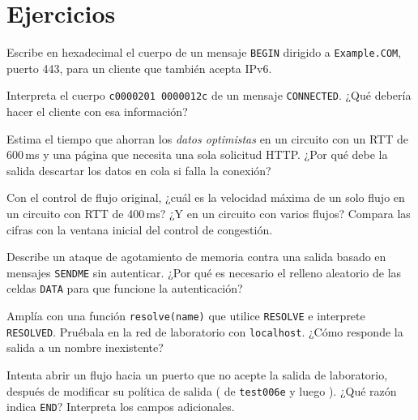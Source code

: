 \section*{Ejercicios}

\begin{esercizio}[1]\label{es:11-begin}
Escribe en hexadecimal el cuerpo de un mensaje \texttt{BEGIN} dirigido a \texttt{Example.COM}, puerto 443, para un cliente que también acepta IPv6.
\end{esercizio}

\begin{esercizio}[1]\label{es:11-connected}
Interpreta el cuerpo \texttt{c0000201 0000012c} de un mensaje \texttt{CONNECTED}. ¿Qué debería hacer el cliente con esa información?
\end{esercizio}

\begin{esercizio}[1]\label{es:11-optimistic}
Estima el tiempo que ahorran los \emph{datos optimistas} en un circuito con un RTT de 600\,ms y una página que necesita una sola solicitud HTTP. ¿Por qué debe la salida descartar los datos en cola si falla la conexión?
\end{esercizio}

\begin{esercizio}[2]\label{es:11-velocita}
Con el control de flujo original, ¿cuál es la velocidad máxima de un solo flujo en un circuito con RTT de 400\,ms? ¿Y en un circuito con varios flujos? Compara las cifras con la ventana inicial del control de congestión.
\end{esercizio}

\begin{esercizio}[2]\label{es:11-sendme-falso}
Describe un ataque de agotamiento de memoria contra una salida basado en mensajes \texttt{SENDME} sin autenticar. ¿Por qué es necesario el relleno aleatorio de las celdas \texttt{DATA} para que funcione la autenticación?
\end{esercizio}

\begin{esercizio}[2]\label{es:11-resolve}
Amplía  con una función \texttt{resolve(name)} que utilice \texttt{RESOLVE} e interprete \texttt{RESOLVED}. Pruébala en la red de laboratorio con \texttt{localhost}. ¿Cómo responde la salida a un nombre inexistente?
\end{esercizio}

\begin{esercizio}[3]\label{es:11-policy}
Intenta abrir un flujo hacia un puerto que no acepte la salida de laboratorio, después de modificar su política de salida ( de \texttt{test006e} y luego ). ¿Qué razón indica \texttt{END}? Interpreta los campos adicionales.
\end{esercizio}

